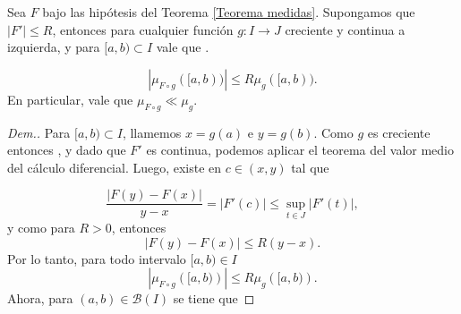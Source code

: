 \begin{lem}\label{lem:mu_fog<<mu_g}
Sea $F$ bajo las hipótesis del Teorema \ref{Teorema medidas}. Supongamos que $|F'|\leq R$, entonces para cualquier función $g:I\to J$ creciente y continua a izquierda, y para $[a,b)\subset I$  vale que \comment{Demostrar la desigual para todo boreliano $A\subset I$, no solo para $A=[a,b)$}. 

\begin{equation}
    |\mu_{F\circ g}([a,b))|\leq R\mu_{g}([a,b)).
\end{equation}
En particular, vale que $\mu_{F\circ g}\ll \mu_g$.\label{lem: abs cont}
\end{lem}
\begin{proof}[Dem.]

Para $[a,b)\subset I$, llamemos $x=g(a)$ e $y=g(b)$. Como $g$ es creciente entonces , y dado que $F'$ es continua, podemos aplicar el  teorema del valor medio del cálculo diferencial. Luego, existe en $c\in (x,y)$ tal que 

	$$ \dfrac{|F(y)-F(x)|}{y-x} =  |F'(c)| \leq \sup_{t\in J}\left|F'(t) \right|, $$
	y como  para $R>0$, entonces
	\begin{equation} \label{eq:f'}
		 |F(y)-F(x)| \leq R (y-x).
	\end{equation}
Por lo tanto, para todo intervalo $[a,b)\in I$
	\begin{equation*}
		|\mu_{F\circ g}\left( [a,b)\right)|\leq R\mu_{g}\left( [a,b)\right).
		\label{eq:medidas}
	\end{equation*}
Ahora, para $(a,b)\in \mathcal{B}(I)$ se tiene que
 


\end{proof}
